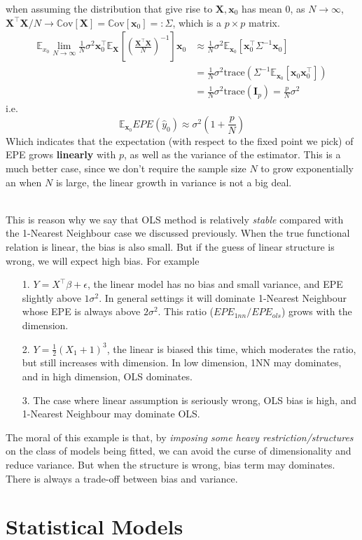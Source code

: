 \documentclass[a4paper, 11pt]{article}
\begin{document}
when assuming the distribution that give rise to $\bm{X}, \bm{x}_0$ has mean 0, as $N\to \infty$, $\bm{X}^{\top}\bm{X}/N \to \mathrm{\mathbb{C}ov}\left[\bm{X}\right] = \mathrm{\mathbb{C}ov}\left[\bm{x}_0\right] =: \Sigma$, which is a $p\times p$ matrix. 
\begin{equation}
	\begin{split}
		\mathbb{E}_{x_0}\lim\limits_{N\rightarrow\infty}\frac{1}{N}\sigma^2\bm{x}_0^{\top} \mathbb{E}_{\bm{X}}\left[\left(\frac{\bm{X}^{\top}\bm{X}}{N}\right)^{-1}\right] \bm{x}_0 & \approx \frac{1}{N}\sigma^2 \mathbb{E}_{\bm{x}_0}\left[\bm{x}_0^{\top}\Sigma^{-1}\bm{x}_0\right]  \\
		&= \frac{1}{N}\sigma^2 \text{trace}\left(\Sigma^{-1}\mathbb{E}_{\bm{x}_0}\left[\bm{x}_0\bm{x}_0^{\top}\right]\right) \\
		&= \frac{1}{N}\sigma^2 \text{trace}(\bm{I}_p) = \frac{p}{N} \sigma^2
	\end{split}
\end{equation}
i.e.
\begin{equation}
	\mathbb{E}_{\bm{x}_0} EPE(\hat{y}_0) \approx \sigma^2 \left(1+\frac{p}{N}\right)
\end{equation}
Which indicates that the expectation (with respect to the fixed point we pick) of EPE grows \textbf{linearly} with $p$, as well as the variance of the estimator. This is a much better case, since we don't require the sample size $N$ to grow exponentially an when $N$ is large, the linear growth in variance is not a big deal. 

~\\
This is reason why we say that OLS method is relatively \emph{stable} compared with the 1-Nearest Neighbour case we discussed previously. When the true functional relation is linear, the bias is also small. But if the guess of linear structure is wrong, we will expect high bias. For example
\begin{itemize}
	\item[1.] $Y=X^{\top}\beta + \epsilon$, the linear model has no bias and small variance, and EPE slightly above $1\sigma^2$. In general settings it will dominate 1-Nearest Neighbour whose EPE is always above $2\sigma^2$. This ratio ($EPE_{1nn}/EPE_{ols}$) grows with the dimension.
	\item[2.] $Y=\frac{1}{2}(X_1+1)^3$, the linear is biased this time, which moderates the ratio, but still increases with dimension. In low dimension, 1NN may dominates, and in high dimension, OLS dominates.
	\item[3.] The case where linear assumption is seriously wrong, OLS bias is high, and 1-Nearest Neighbour may dominate OLS.
\end{itemize}
The moral of this example is that, by \emph{imposing some heavy restriction/structures} on the class of models being fitted, we can avoid the curse of dimensionality and reduce variance. But when the structure is wrong, bias term may dominates. There is always a trade-off between bias and variance.


\section{Statistical Models}
\end{document}
